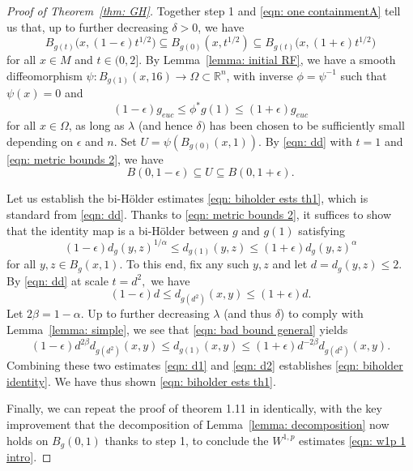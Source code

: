 \documentclass[11pt,reqno]{amsart}
\theoremstyle{remark}
\theoremstyle{definition}
\numberwithin{equation}{section}
\newcommand{\R}{{\mathbb{R}}}
\newcommand{\e}{{\epsilon}}
\newcommand{\ETA}{{{\lambda}}}
\begin{document}
\begin{proof}[Proof of Theorem~\ref{thm: GH}]
Together step 1 and \eqref{eqn: one containmentA} tell us that, up to further decreasing $\delta>0$, we have 
\begin{equation}
	\label{eqn: dd}
B_{g(t)}\big(x, (1-\e) t^{1/2} \big) \subseteq B_{g(0)}(x, t^{1/2}) \subseteq B_{g(t)}\big(x,(1+\e) t^{1/2}\big)
\end{equation}
for all $x\in M$ and $t \in (0,2]$. 
By Lemma~\ref{lemma: initial RF}, we have a smooth diffeomorphism $\psi:B_{g(1)}(x,16)\to \Omega\subset \R^n$, with inverse $\phi = \psi^{-1}$ such that $\psi(x)=0$ and
\begin{equation}
			\label{eqn: metric bounds 2}
		(1-\e) g_{euc}  \leq   \phi^*g(1)\leq (1+\e)g_{euc} 
\end{equation}
for all $x\in \Omega$,  as long as $\ETA$ (and hence $\delta)$ has been chosen to be sufficiently small depending on $\e$ and $n$. Set $U= \psi(B_{g(0)}(x,1))$. By \eqref{eqn: dd} with $t=1$ and \eqref{eqn: metric bounds 2}, we have 
\begin{equation}\label{eqn: U containment}
	B(0,1-\e)\subseteq U\subseteq B(0,1+\e).
\end{equation}


Let us establish the bi-H\"{o}lder estimates \eqref{eqn: biholder ests th1}, which is standard from \eqref{eqn: dd}. Thanks to \eqref{eqn: metric bounds 2}, it suffices to show that the identity map is a bi-H\"{o}lder between $g$ and $g(1)$ satisfying
\begin{equation}\label{eqn: biholder identity}
 	(1-\e)d_{g}(y,z)^{1/\alpha}\leq d_{g(1)}(y,z) \leq (1+\e)d_{g}(y,z)^\alpha
\end{equation}
for all $y,z \in B_{g}(x,1)$. To this end, fix any such $y,z$ and let $d=d_{g}(y,z)\leq 2.$ By \eqref{eqn: dd} at scale $t =d^2,$ we have
\begin{equation}\label{eqn: d1}
(1-\e)	d\leq d_{g(d^2)}(x,y) \leq (1+\e)d.
\end{equation}
Let $2\beta = 1-\alpha$. Up to further decreasing $\ETA$ (and thus $\delta$) to comply with  Lemma~\ref{lemma: simple}, we see that \eqref{eqn: bad bound general} yields
\begin{equation}\label{eqn: d2}
(1-\e)d^{2\beta} d_{g(d^2)}(x,y) 	\leq d_{g(1)}(x,y) \leq (1+\e)d^{-2\beta} d_{g(d^2)}(x,y).
\end{equation}
Combining these two estimates \eqref{eqn: d1} and \eqref{eqn: d2} establishes \eqref{eqn: biholder identity}. We have thus shown \eqref{eqn: biholder ests th1}.


Finally, we can repeat the proof of theorem 1.11 in \cite[Section 6]{LNN1} identically, with the key improvement that the decomposition of Lemma~\ref{lemma: decomposition} now holds on $B_g(0,1)$ thanks to step 1, to conclude the $W^{1,p}$ estimates \eqref{eqn: w1p 1 intro}.
\end{proof}
\end{document}

